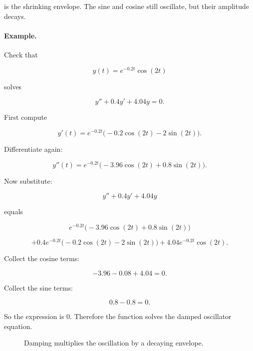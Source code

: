 is the shrinking envelope.  The sine and cosine still oscillate, but their amplitude decays.

\paragraph{Example.}
Check that

\[
y(t)=e^{-0.2t}\cos(2t)
\]

solves

\[
y''+0.4y'+4.04y=0.
\]

First compute

\[
y'(t)=e^{-0.2t}\bigl(-0.2\cos(2t)-2\sin(2t)\bigr).
\]

Differentiate again:

\[
y''(t)=e^{-0.2t}\bigl(-3.96\cos(2t)+0.8\sin(2t)\bigr).
\]

Now substitute:

\[
y''+0.4y'+4.04y
\]

equals

\[
e^{-0.2t}\bigl(-3.96\cos(2t)+0.8\sin(2t)\bigr)
\]

\[
+0.4e^{-0.2t}\bigl(-0.2\cos(2t)-2\sin(2t)\bigr)
+
4.04e^{-0.2t}\cos(2t).
\]

Collect the cosine terms:

\[
-3.96-0.08+4.04=0.
\]

Collect the sine terms:

\[
0.8-0.8=0.
\]

So the expression is \(0\).  Therefore the function solves the damped oscillator
equation.

\begin{figure}[h]
\centering
{}
\caption{Damping multiplies the oscillation by a decaying envelope.}
\label{fig:damped-oscillation}
\end{figure}

